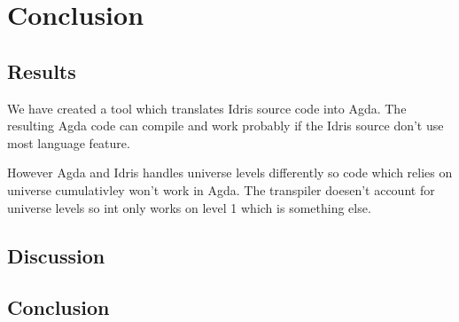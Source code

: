 \chapter{Conclusion}


\section{Results}

We have created a tool which translates Idris source code into Agda. The
resulting Agda code can compile and work probably if the Idris source don't use
most language feature.

However Agda and Idris handles universe levels differently so code which relies
on universe cumulativley won't work in Agda. The transpiler doesen't account
for universe levels so int only works on level 1 which is something else.


\section{Discussion}



\section{Conclusion}
